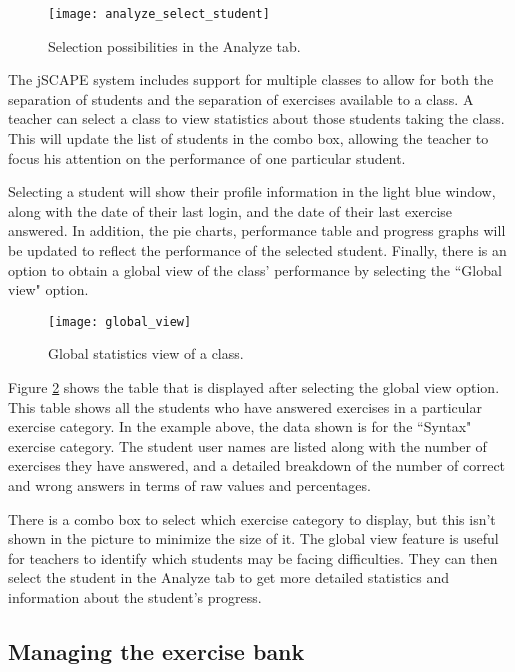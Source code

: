 \begin{figure}[H]
\centering
\texttt{[image: analyze\_select\_student]}
\caption{Selection possibilities in the Analyze tab.}
\label{fig:analyze_select_student}
\end{figure}

The jSCAPE system includes support for multiple classes to allow for both the separation of students and the separation of exercises available to a class. A teacher can select a class to view statistics about those students taking the class. This will update the list of students in the combo box, allowing the teacher to focus his attention on the performance of one particular student. \newline

Selecting a student will show their profile information in the light blue window, along with the date of their last login, and the date of their last exercise answered. In addition, the pie charts, performance table and progress graphs will be updated to reflect the performance of the selected student. Finally, there is an option to obtain a global view of the class' performance by selecting the ``Global view" option. 

\begin{figure}[H]
\centering
\texttt{[image: global\_view]}
\caption{Global statistics view of a class.}
\label{fig:global_view}
\end{figure}

Figure \ref{fig:global_view} shows the table that is displayed after selecting the global view option. This table shows all the students who have answered exercises in a particular exercise category. In the example above, the data shown is for the ``Syntax" exercise category. The student user names are listed along with the number of exercises they have answered, and a detailed breakdown of the number of correct and wrong answers in terms of raw values and percentages. \newline

There is a combo box to select which exercise category to display, but this isn't shown in the picture to minimize the size of it. The global view feature is useful for teachers to identify which students may be facing difficulties. They can then select the student in the Analyze tab to get more detailed statistics and information about the student's progress.

\subsection{Managing the exercise bank}
